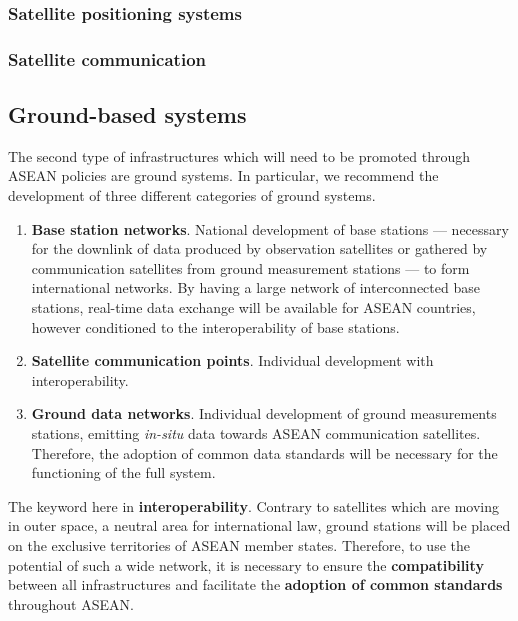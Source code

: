\subsubsection{Satellite positioning systems}

\tab

\subsubsection{Satellite communication}

\tab 



\subsection{Ground-based systems}

\tab The second type of infrastructures which will need to be promoted through ASEAN policies are ground systems. In particular, we recommend the development of three different categories of ground systems.

\begin{enumerate}

\item \textbf{Base station networks}. National development of base stations --- necessary for the downlink of data produced by observation satellites or gathered by communication satellites from ground measurement stations --- to form international networks. By having a large network of interconnected base stations, real-time data exchange will be available for ASEAN countries, however conditioned to the interoperability of base stations.

\item \textbf{Satellite communication points}. Individual development with interoperability.

\item \textbf{Ground data networks}. Individual development of ground measurements stations, emitting \textit{in-situ} data towards ASEAN communication satellites. Therefore, the adoption of common data standards will be necessary for the functioning of the full system.

\end{enumerate}

The keyword here in \textbf{interoperability}. Contrary to satellites which are moving in outer space, a neutral area for international law, ground stations will be placed on the exclusive territories of ASEAN member states. Therefore, to use the potential of such a wide network, it is necessary to ensure the \textbf{compatibility} between all infrastructures and facilitate the \textbf{adoption of common standards} throughout ASEAN.


